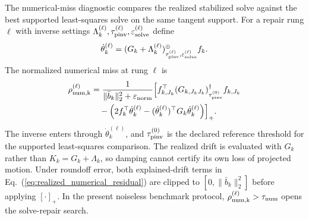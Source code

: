 \documentclass[
  reprint,
  amsmath,
  amssymb,
  aps,
  pra,
  nofootinbib,
  superscriptaddress,
  floatfix
]{revtex4-2}
\newcommand{\eps}{\varepsilon}
\begin{document}
The numerical-miss diagnostic compares the realized stabilized solve against the best supported least-squares solve on the same tangent support.  For a repair rung $\ell$ with inverse settings
$\Lambda_k^{(\ell)},\tau_{\rm pinv}^{(\ell)},\eps_{\rm solve}^{(\ell)}$ define
\begin{equation}
\dot\theta_k^{(\ell)}
=
(G_k+\Lambda_k^{(\ell)})_{\tau_{\rm pinv}^{(\ell)},\eps_{\rm solve}^{(\ell)}}^{\oplus}f_k .
\label{eq:repair_rung_velocity}
\end{equation}
The normalized numerical miss at rung $\ell$ is
\begin{equation}
\begin{aligned}
\rho_{\rm num,k}^{(\ell)}
&=
\frac{1}{
\|\bar b_k\|_2^2+\eps_{\rm norm}
}
\Bigl[
f_{k,J_k}^{\top}
(G_{k,J_kJ_k})_{\tau_{\rm pinv}^{(0)}}^\dagger
f_{k,J_k}
\\
&\quad-
\left(
2f_k^\top\dot\theta_k^{(\ell)}
-
(\dot\theta_k^{(\ell)})^\top G_k\dot\theta_k^{(\ell)}
\right)
\Bigr]_+ .
\end{aligned}
\label{eq:realized_numerical_residual}
\end{equation}
The inverse enters through $\dot\theta_k^{(\ell)}$, and $\tau_{\rm pinv}^{(0)}$ is the declared reference threshold for the supported least-squares comparison.  The realized drift is evaluated with $G_k$ rather than $K_k=G_k+\Lambda_k$, so damping cannot certify its own loss of projected motion.  Under roundoff error, both explained-drift terms in Eq.~(\ref{eq:realized_numerical_residual}) are clipped to $[0,\|\bar b_k\|_2^2]$ before applying $[\cdot]_+$.  In the present noiseless benchmark protocol, $\rho_{\rm num,k}^{(\ell)}>\tau_{\rm num}$ opens the solve-repair search.
\end{document}
